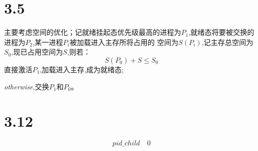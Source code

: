 \documentclass[UTF8]{ctexart}
\begin{document}
    \section*{3.5}
    主要考虑空间的优化；记就绪挂起态优先级最高的进程为$P_1$,就绪态将要被交换的进程为$P_2$,某一进程$P_i$被加载进入主存所将占用的
    空间为$S(P_i)$,记主存总空间为$S_0$,现已占用空间为$S$,则若：
    $$S(P_0) + S \le S_0$$
    \qquad 直接激活$P_1$,加载进入主存,成为就绪态;\par
    \emph{otherwise},交换$P_1$和$P_0$。\\
    \section*{3.12}
    \begin{large}
      
      $$pid\_child \quad 0$$
    \end{large}
    

    
\end{document}
